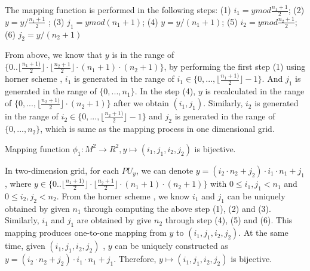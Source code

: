 \documentclass[AMA,LATO1COL]{WileyNJD-v2}
\begin{document}
The mapping function is performed in the following steps:
(1) $i_1= y mod \frac{n_1+1}{2}$; (2) $y = y / \frac{n_1+1}{2}$ ; (3) $j_1 = y mod (n_1+1)$; (4) $y = y / (n_1+1)$; (5) $i_2= y mod \frac{n_2+1}{2}$; (6) $j_2 = y / (n_2+1)$

From above, we know that $y$ is in the range of $\{0.. \lfloor {\frac{n_1+1)}{2}\rfloor}\cdot \lfloor {\frac{n_2+1}{2}\rfloor \cdot (n_1+1)\cdot (n_2+1)}\}$, by performing the first step (1) using  horner scheme , $i_1$ is generated in the range of $i_1 \in \{0,...,\lfloor {\frac{n_1+1)}{2}\rfloor}-1\}$. And $j_1$ is generated in the range of $\{0,...,n_1\}$. In the step (4), $y$ is recalculated in the range of $\{0,...,\lfloor {\frac{n_2+1)}{2}\rfloor}\cdot (n_2+1)\}$ after we obtain $(i_1,j_1)$. Similarly, $i_2$ is generated in the range of $i_2 \in \{0,...,\lfloor {\frac{n_2+1)}{2}\rfloor}-1\}$ and $j_2$ is generated in the range of $\{0,...,n_2\}$, which is same as the mapping process in one dimensional grid.
\vspace{5mm}
\begin{lemma}\label{lemmaphi2}
Mapping function $\phi_1:   M^2 \rightarrow  R^2, y \mapsto (i_1,j_1,i_2,j_2)$ is bijective.
\end{lemma}
 In two-dimension grid, for each $PU_y$, we can denote $y=(i_2\cdot n_2+j_2)\cdot i_1\cdot n_1+j_1$, where $y \in \{0.. \lfloor {\frac{n_1+1)}{2}\rfloor}\cdot \lfloor {\frac{n_2+1}{2}\rfloor \cdot (n_1+1)\cdot (n_2+1)}\}$ with  $0\leq i_1, j_1 < n_1$ and $0\leq i_2, j_2 < n_2$. From the horner scheme , we know $ i_1$ and $j_1$ can be uniquely obtained by given $n_1$ through computing the above step (1), (2) and (3). Similarly, $ i_1$ and $j_1$ are obtained by give $n_2$ through step (4), (5) and (6). This mapping produces one-to-one mapping from $y$ to $(i_1,j_1,i_2,j_2)$. At the same time, given $(i_1,j_1,i_2,j_2)$ , $y$ can be uniquely constructed as $y=(i_2\cdot n_2+j_2)\cdot i_1\cdot n_1+j_1$. Therefore, $y \mapsto (i_1,j_1,i_2,j_2)$ is bijective.
\vspace{5mm}
\end{document}
